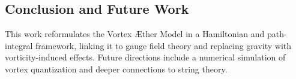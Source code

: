 \subsection{Conclusion and Future Work}
This work reformulates the Vortex Æther Model in a Hamiltonian and path-integral framework, linking it to gauge field theory and replacing gravity with vorticity-induced effects. Future directions include a numerical simulation of vortex quantization and deeper connections to string theory.

